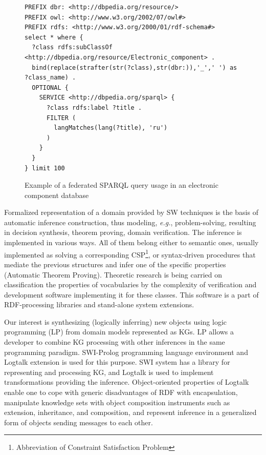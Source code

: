 \documentclass[
]{ceurart}
\begin{document}
\begin{figure}[bth]
  \centering
\begin{verbatim}
PREFIX dbr: <http://dbpedia.org/resource/>
PREFIX owl: <http://www.w3.org/2002/07/owl#>
PREFIX rdfs: <http://www.w3.org/2000/01/rdf-schema#>
select * where {
  ?class rdfs:subClassOf <http://dbpedia.org/resource/Electronic_component> .
  bind(replace(strafter(str(?class),str(dbr:)),'_',' ') as ?class_name) .
  OPTIONAL {
    SERVICE <http://dbpedia.org/sparql> {
      ?class rdfs:label ?title .
      FILTER (
        langMatches(lang(?title), 'ru')
      )
    }
  }
} limit 100
\end{verbatim}
  \caption{Example of a federated SPARQL query usage in an electronic component database}
  \label{fig:sparql-ex1}
\end{figure}

Formalized representation of a domain provided by SW techniques is the basis of automatic inference construction, thus modeling, \emph{e.g.}, problem-solving, resulting in decision synthesis, theorem proving, domain verification.  The inference is implemented in various ways.  All of them belong either to semantic ones, usually implemented as solving a corresponding CSP\footnote{Abbreviation of Constraint Satisfaction Problem}, or syntax-driven procedures that mediate the previous structures and infer one of the specific properties (Automatic Theorem Proving).  Theoretic research is being carried on classification the properties of vocabularies by the complexity of verification and development software implementing it for these classes.  This software is a  part of RDF-processing libraries and stand-alone system extensions.

Our interest is synthesizing (logically inferring) new objects using logic programming (LP) from domain models represented as KGs.  LP allows a developer to combine KG processing with other inferences in the same programming paradigm.  SWI-Prolog programming language environment and Logtalk extension is used for this purpose.  SWI system has a library for representing and processing KG, and Logtalk is used to implement transformations providing the inference.  Object-oriented properties of Logtalk enable one to cope with generic disadvantages of RDF with encapsulation, manipulate knowledge sets with object composition instruments such as extension, inheritance, and composition, and represent inference in a generalized form of objects sending messages to each other.
\end{document}
